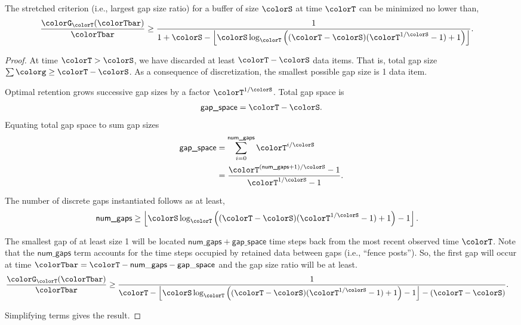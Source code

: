 \begin{lemma}
\label{thm:stretched-ideal-strict}
The stretched criterion (i.e., largest gap size ratio) for a buffer of size $\colorS$ at time $\colorT$ can be minimized no lower than,
\begin{align*}
\frac{\colorG_{\colorT}(\colorTbar)}{\colorTbar}
&\geq
\frac{
  1
}{
  1 + \colorS
  - \left\lfloor \colorS \log_{\colorT}\Big(
    (\colorT - \colorS)(\colorT^{1/\colorS} - 1) + 1
  \Big)\right\rfloor
}.
\end{align*}
\end{lemma}

\begin{proof}
At time $\colorT > \colorS$, we have discarded at least $\colorT - \colorS$ data items.
That is, total gap size $\sum \colorg \geq \colorT - \colorS$.
As a consequence of discretization, the smallest possible gap size is 1 data item.

Optimal retention grows successive gap sizes by a factor $\colorT^{1/\colorS}$.
Total gap space is
\begin{align*}
\textsf{gap\_space} = \colorT - \colorS.
\end{align*}
Equating total gap space to sum gap sizes
\begin{align*}
\textsf{gap\_space}
&=
\sum_{i = 0}^{\textsf{num\_gaps}} \colorT^{i/\colorS} %
\\
&=
\frac{
  \colorT^{(\textsf{num\_gaps} + 1)/\colorS} - 1
}{
  \colorT^{1/\colorS} - 1
}.
\end{align*}

The number of discrete gaps instantiated follows as at least,
\begin{align*}
\textsf{num\_gaps}
&\geq
\left\lfloor
\colorS \log_{\colorT}\Big(
  (\colorT - \colorS)(\colorT^{1/\colorS} - 1) + 1
\Big) - 1
\right\rfloor.
\end{align*}

The smallest gap of at least size 1 will be located $\mathsf{num\_gaps} + \mathsf{gap\_space}$ time steps back from the most recent observed time $\colorT$.
Note that the $\mathsf{num\_gaps}$ term accounts for the time steps occupied by retained data between gaps (i.e., ``fence posts'').
So, the first gap will occur at time $\colorTbar = \colorT - \mathsf{num\_gaps} - \mathsf{gap\_space}$ and the gap size ratio will be at least.
\begin{align*}
\frac{\colorG_{\colorT}(\colorTbar)}{\colorTbar}
&\geq
\frac{1}{
\colorT
- \left\lfloor
\colorS \log_{\colorT}\Big(
  (\colorT - \colorS)(\colorT^{1/\colorS} - 1) + 1
\Big) - 1
\right\rfloor - (\colorT - \colorS)
}.
\end{align*}

Simplifying terms gives the result.
\end{proof}
